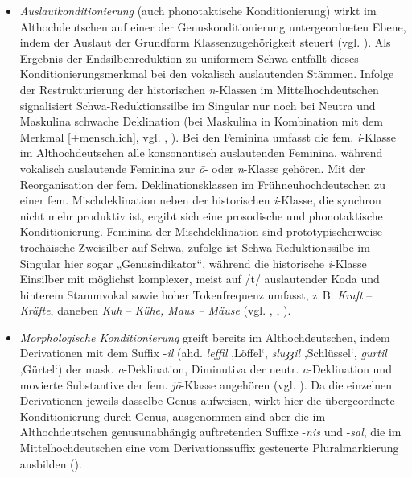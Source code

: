 \begin{itemize}
\item \textit{Auslautkonditionierung} (auch phonotaktische Konditionierung) wirkt im Althochdeutschen auf einer der Genuskonditionierung untergeordneten Ebene, indem der Auslaut der Grundform Klassenzugehörigkeit steuert (vgl. \citealt[107]{Kürschner2008a}). Als Ergebnis der Endsilbenreduktion zu uniformem Schwa entfällt dieses Konditionierungsmerkmal bei den vokalisch auslautenden Stämmen. Infolge der Restrukturierung der historischen \textit{n}{}-Klassen im Mittelhochdeutschen signalisiert Schwa-Reduktionssilbe im Singular nur noch bei Neutra und Maskulina schwache Deklination (bei Maskulina in Kombination mit dem Merkmal [+menschlich], vgl. \citealt{Köpcke2000a}, \citealt[107]{Kürschner2008a}). Bei den Feminina umfasst die fem. \textit{i}{}-Klasse im Althochdeutschen alle konsonantisch auslautenden Feminina, während vokalisch auslautende Feminina zur \textit{ō}{}- oder \textit{n}{}-Klasse gehören. Mit der Reorganisation der fem. Deklinationsklassen im Frühneuhochdeutschen zu einer fem. Mischdeklination neben der historischen \textit{i}{}-Klasse, die synchron nicht mehr produktiv ist, ergibt sich eine prosodische und phonotaktische Konditionierung. Feminina der Mischdeklination sind prototypischerweise trochäische Zweisilber auf Schwa, \citet[128]{Köpcke1993} zufolge ist Schwa-Reduktionssilbe im Singular hier sogar „Genusindikator“, während die historische \textit{i}{}-Klasse Einsilber mit möglichst komplexer, meist auf /t/ auslautender Koda und hinterem Stammvokal sowie hoher Tokenfrequenz umfasst, z.\,B. \textit{Kraft} -- \textit{Kräfte}, daneben \textit{Kuh} -- \textit{Kühe, Maus -- Mäuse} (vgl. \citealt[124--128]{Köpcke1993}, \citealt[110]{Kürschner2008a}, \citealt[302--304]{Nübling2008}).
\item \textit{Morphologische Konditionierung} greift bereits im Althochdeutschen, indem Derivationen mit dem Suffix -\textit{il} (ahd. \textit{leffil} ‚Löffel‘, \textit{sluȝȝil} ‚Schlüssel‘, \textit{gurtil} ‚Gürtel‘) der mask. \textit{a}{}-Deklination, Diminutiva der neutr. \textit{a}{}-Deklination und movierte Substantive der fem. \textit{jō}{}-Klasse angehören (vgl. \citealt[§194, §196, §211]{BrauneHeidermanns2018}). Da die einzelnen Derivationen jeweils dasselbe Genus aufweisen, wirkt hier die übergeordnete Konditionierung durch Genus, ausgenommen sind aber die im Althochdeutschen genusunabhängig auftretenden Suffixe -\textit{nis} und -\textit{sal}, die im Mittelhochdeutschen eine vom Derivationssuffix gesteuerte Pluralmarkierung ausbilden (\citealt[104 und 122--123]{Kürschner2008a}).
\end{itemize}

